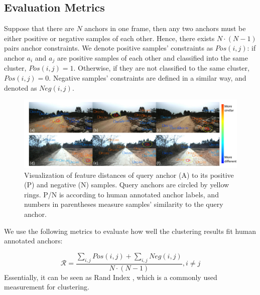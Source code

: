 \documentclass[letterpaper, 10 pt, conference]{ieeeconf}  %
\begin{document}
\subsection{Evaluation Metrics}
Suppose that there are $N$ anchors in one frame, then any two anchors must be either positive or negative samples of each other. Hence, there exists $N \cdot(N-1)$ pairs anchor constraints.
We denote positive samples' constraints as $Pos(i,j)$: if anchor $a_i$ and $a_j$ are positive samples of each other and classified into the same cluster, $Pos(i,j)=1$. Otherwise, if they are not classified to the same cluster, $Pos(i,j)=0$.
Negative samples' constraints are defined in a similar way, and denoted as $Neg(i,j)$.

\begin{figure}[]
	\centering
	\includegraphics[scale=0.4]{anchor_dis.pdf}
	\caption{Visualization of feature distances of query anchor (A) to its positive (P) and negative (N) samples. Query anchors are circled by yellow rings. P/N is according to human annotated anchor labels, and numbers in parentheses measure samples' similarity to the query anchor.}
	\label{fig:anchor_dis}
\end{figure}

We use the following metrics to evaluate how well the clustering results fit human annotated anchors:

\begin{equation}
\mathcal{R}=\dfrac{\sum_{i,j}{Pos(i,j)}+\sum_{i,j}{Neg(i,j)}}{N\cdot (N-1)}, i \neq j
\end{equation}
Essentially, it can be seen as Rand Index \cite{rand1971objective}, which is a commonly used measurement for clustering.
\end{document}
